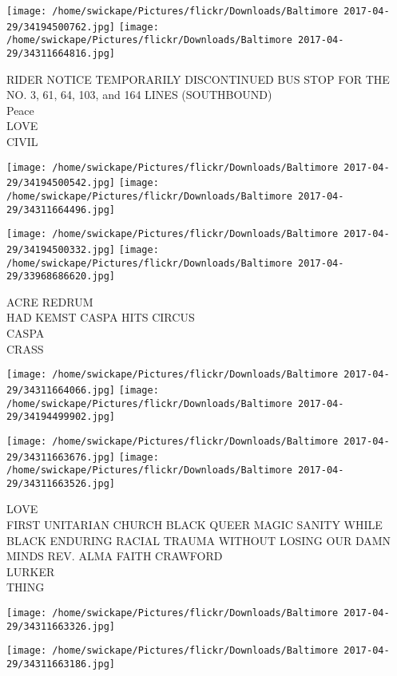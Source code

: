 \documentclass[10pt,letterpaper]{article}
\begin{document}
\texttt{[image: /home/swickape/Pictures/flickr/Downloads/Baltimore 2017-04-29/34194500762.jpg]}
\texttt{[image: /home/swickape/Pictures/flickr/Downloads/Baltimore 2017-04-29/34311664816.jpg]}

RIDER NOTICE TEMPORARILY DISCONTINUED BUS STOP FOR THE NO. 3, 61, 64, 103, and 164 LINES (SOUTHBOUND)\\
Peace\\
LOVE\\
CIVIL\\
\pagebreak

\texttt{[image: /home/swickape/Pictures/flickr/Downloads/Baltimore 2017-04-29/34194500542.jpg]}
\texttt{[image: /home/swickape/Pictures/flickr/Downloads/Baltimore 2017-04-29/34311664496.jpg]}

\texttt{[image: /home/swickape/Pictures/flickr/Downloads/Baltimore 2017-04-29/34194500332.jpg]}
\texttt{[image: /home/swickape/Pictures/flickr/Downloads/Baltimore 2017-04-29/33968686620.jpg]}

ACRE REDRUM\\
HAD KEMST CASPA HITS CIRCUS\\
CASPA\\
CRASS\\
\pagebreak

\texttt{[image: /home/swickape/Pictures/flickr/Downloads/Baltimore 2017-04-29/34311664066.jpg]}
\texttt{[image: /home/swickape/Pictures/flickr/Downloads/Baltimore 2017-04-29/34194499902.jpg]}

\texttt{[image: /home/swickape/Pictures/flickr/Downloads/Baltimore 2017-04-29/34311663676.jpg]}
\texttt{[image: /home/swickape/Pictures/flickr/Downloads/Baltimore 2017-04-29/34311663526.jpg]}

LOVE\\
FIRST UNITARIAN CHURCH BLACK QUEER MAGIC SANITY WHILE BLACK ENDURING RACIAL TRAUMA WITHOUT LOSING OUR DAMN MINDS REV. ALMA FAITH CRAWFORD\\
LURKER\\
THING\\
\pagebreak

\texttt{[image: /home/swickape/Pictures/flickr/Downloads/Baltimore 2017-04-29/34311663326.jpg]}

\vspace{0.25in}
\texttt{[image: /home/swickape/Pictures/flickr/Downloads/Baltimore 2017-04-29/34311663186.jpg]}
\end{document}
